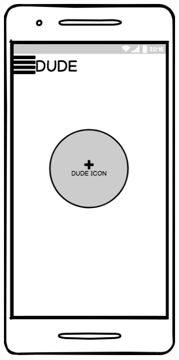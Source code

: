 \begin{figure}[H]
\begin{subfigure}[b]{0.20\textwidth}
    \label{fig:balsamiq}
  \end{subfigure}
  \begin{subfigure}[b]{0.20\textwidth}
    \includegraphics[width=\textwidth, keepaspectratio]{images/balsamiq04}

\end{subfigure}
\end{figure}
